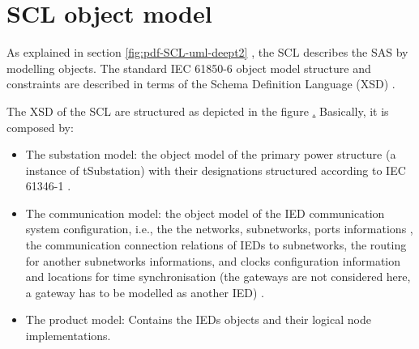 \section{SCL object model}


As explained in section \ref{fig:pdf-SCL-uml-deept2} , 
the SCL describes the SAS by modelling objects.
The standard IEC 61850-6 \cite{IEC61850-6:2004} object model 
structure and constraints are described in terms of the 
Schema Definition Language (XSD) .

The XSD of the SCL are structured as depicted 
in the figure \href{fig:pdf-SCL-uml-deept2}. 
Basically, it is composed by: 

\begin{itemize}
  \item The substation model: the object model of the primary power structure
  		(a instance of tSubstation) with their designations structured according to 
  		IEC 61346-1 \cite{IEC61346-1:1996}. 
  \item The communication model: the object model of the IED 
  		communication system configuration, 
  		i.e.,
  		the the networks, subnetworks, ports informations
  		,
  		the communication connection relations of IEDs to 
  		subnetworks, the routing for another subnetworks informations, 
  		and clocks configuration information and locations for 
  		time synchronisation (the gateways are not considered here, 
  		a gateway has to be modelled as another IED)
  		.
  \item The product model: Contains the IEDs objects and their 
  		logical node implementations. 	
\end{itemize}


